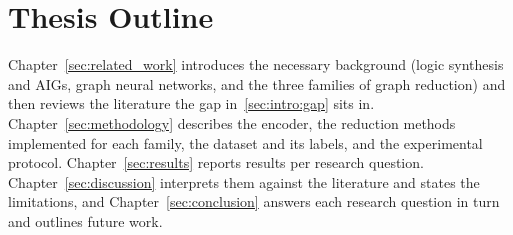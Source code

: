 \section{Thesis Outline}
\label{sec:intro:outline}
Chapter~\ref{sec:related_work} introduces the necessary background (logic synthesis and
AIGs, graph neural networks, and the three families of graph reduction) and then reviews
the literature the gap in~\ref{sec:intro:gap} sits in. Chapter~\ref{sec:methodology}
describes the encoder, the reduction methods implemented for each family, the dataset and
its labels, and the experimental protocol. Chapter~\ref{sec:results} reports results
per research question. Chapter~\ref{sec:discussion} interprets them against the literature
and states the limitations, and Chapter~\ref{sec:conclusion} answers each research question
in turn and outlines future work.

